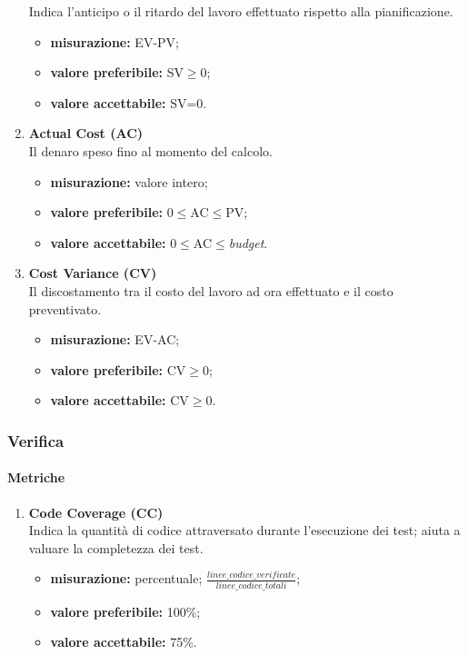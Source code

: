 \begin{enumerate}
			Indica l'anticipo o il ritardo del lavoro effettuato rispetto alla pianificazione.
			\begin{itemize}
				\item \textbf{misurazione:} EV-PV;
				\item \textbf{valore preferibile:} SV$\geq$0;
				\item \textbf{valore accettabile:} SV=0.
			\end{itemize}
		\item[]
			\textbf{Actual Cost (AC)}\\
			Il denaro speso fino al momento del calcolo.
			\begin{itemize}
				\item \textbf{misurazione:} valore intero;
				\item \textbf{valore preferibile:} 0$\leq$AC$\leq$PV;
				\item \textbf{valore accettabile:} 0$\leq$AC$\leq$\textit{budget}.
			\end{itemize}
		\item[]
			\textbf{Cost Variance (CV)}\\
			Il discostamento tra il costo del lavoro ad ora effettuato e il costo preventivato.
			\begin{itemize}
				\item \textbf{misurazione:} EV-AC;
				\item \textbf{valore preferibile:} CV$\geq$0;
				\item \textbf{valore accettabile:} CV$\geq$0.
			\end{itemize}
		\end{enumerate}
	\subsubsection{Verifica}
		\paragraph{Metriche}
		\begin{enumerate}
		\item[]
			\textbf{Code Coverage (CC)}\\
			Indica la quantità di codice attraversato durante l'esecuzione dei test; aiuta a valuare la completezza dei test.
			\begin{itemize}
				\item \textbf{misurazione:} percentuale; $\frac{linee\_codice\_verificate}{linee\_codice\_totali}$;
				\item \textbf{valore preferibile:} 100\%;
				\item \textbf{valore accettabile:} 75\%.
			\end{itemize}
		\end{enumerate}
